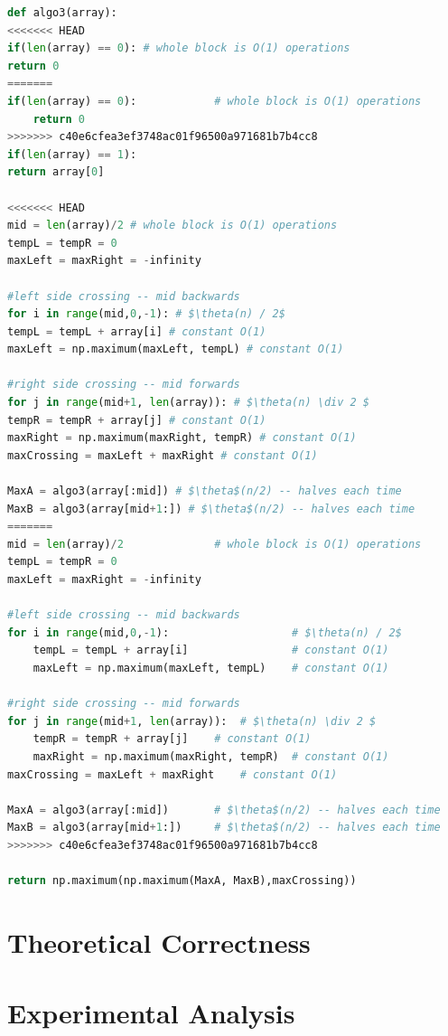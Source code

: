 \documentclass[a4paper,12pt]{article}
\begin{document}
  \begin{lstlisting}[language=python,caption={pseudo code for $n\log(n)$ algorithm},mathescape]
def algo3(array):
<<<<<<< HEAD
if(len(array) == 0): # whole block is O(1) operations
return 0
=======
if(len(array) == 0):			# whole block is O(1) operations
	return 0
>>>>>>> c40e6cfea3ef3748ac01f96500a971681b7b4cc8
if(len(array) == 1):
return array[0]

<<<<<<< HEAD
mid = len(array)/2 # whole block is O(1) operations
tempL = tempR = 0
maxLeft = maxRight = -infinity

#left side crossing -- mid backwards
for i in range(mid,0,-1): # $\theta(n) / 2$
tempL = tempL + array[i] # constant O(1)
maxLeft = np.maximum(maxLeft, tempL) # constant O(1)

#right side crossing -- mid forwards
for j in range(mid+1, len(array)): # $\theta(n) \div 2 $
tempR = tempR + array[j] # constant O(1)
maxRight = np.maximum(maxRight, tempR) # constant O(1)
maxCrossing = maxLeft + maxRight # constant O(1)

MaxA = algo3(array[:mid]) # $\theta$(n/2) -- halves each time
MaxB = algo3(array[mid+1:]) # $\theta$(n/2) -- halves each time
=======
mid = len(array)/2				# whole block is O(1) operations
tempL = tempR = 0
maxLeft = maxRight = -infinity

#left side crossing -- mid backwards	
for i in range(mid,0,-1):					# $\theta(n) / 2$ 
	tempL = tempL + array[i]				# constant O(1)
	maxLeft = np.maximum(maxLeft, tempL)	# constant O(1)

#right side crossing -- mid forwards
for j in range(mid+1, len(array)):	# $\theta(n) \div 2 $
	tempR = tempR + array[j]	# constant O(1)
	maxRight = np.maximum(maxRight, tempR)	# constant O(1)
maxCrossing = maxLeft + maxRight	# constant O(1)

MaxA = algo3(array[:mid])		# $\theta$(n/2) -- halves each time
MaxB = algo3(array[mid+1:])		# $\theta$(n/2) -- halves each time
>>>>>>> c40e6cfea3ef3748ac01f96500a971681b7b4cc8

return np.maximum(np.maximum(MaxA, MaxB),maxCrossing))
  \end{lstlisting}

\section*{Theoretical Correctness}

\section*{Experimental Analysis}
\end{document}
